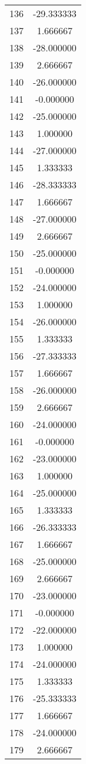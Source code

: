 \documentclass[12pt]{article}
\begin{document}
\begin{longtable}{@{}cc@{}}
136 & -29.333333 \\
137 & 1.666667 \\
138 & -28.000000 \\
139 & 2.666667 \\
140 & -26.000000 \\
141 & -0.000000 \\
142 & -25.000000 \\
143 & 1.000000 \\
144 & -27.000000 \\
145 & 1.333333 \\
146 & -28.333333 \\
147 & 1.666667 \\
148 & -27.000000 \\
149 & 2.666667 \\
150 & -25.000000 \\
151 & -0.000000 \\
152 & -24.000000 \\
153 & 1.000000 \\
154 & -26.000000 \\
155 & 1.333333 \\
156 & -27.333333 \\
157 & 1.666667 \\
158 & -26.000000 \\
159 & 2.666667 \\
160 & -24.000000 \\
161 & -0.000000 \\
162 & -23.000000 \\
163 & 1.000000 \\
164 & -25.000000 \\
165 & 1.333333 \\
166 & -26.333333 \\
167 & 1.666667 \\
168 & -25.000000 \\
169 & 2.666667 \\
170 & -23.000000 \\
171 & -0.000000 \\
172 & -22.000000 \\
173 & 1.000000 \\
174 & -24.000000 \\
175 & 1.333333 \\
176 & -25.333333 \\
177 & 1.666667 \\
178 & -24.000000 \\
179 & 2.666667 \\

\end{longtable}
\end{document}
